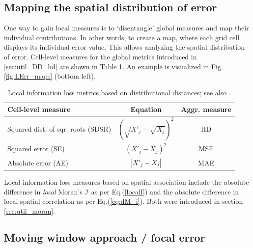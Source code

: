 \subsection{Mapping the spatial distribution of error} \label{sec:util_LOC_cellerror}

One way to gain local measures is to `disentangle' global measures and map their individual contributions. In other words, to create a map, where each grid cell displays its individual error value. This allows analyzing the spatial distribution of error. Cell-level measures for the global metrics introduced in \ref{sec:util_DD_hd} are shown in Table \ref{tab:util_cellLVL}.
An example is visualized in Fig. \ref{fig:LErr_maps} (bottom left).

\begin{table}[H]
    \centering
    \begin{tabular}{l c c}
    \hline
    Cell-level measure & Equation & Aggr. measure \\
    \hline
        \rule{0pt}{18pt} Squared dist. of sqr. roots (SDSR) &  $\left(\sqrt{X'_j} - \sqrt{X_j}\right)^2$ & HD \\
        \rule{0pt}{18pt} Squared error (SE) & $\left(X'_j - X_j\right)^2$ & MSE  \\
        \rule{0pt}{18pt} Absolute error (AE) & $\left|X'_j - X_j\right|$ & MAE  \\
        \hline
    \end{tabular}
    \caption{Local information loss metrics based on distributional distances; see also \citet{AntalEtAl2017}.}
    \label{tab:util_cellLVL}
\end{table}

Local information loss measures based on spatial association include the absolute difference in \emph{local} Moran's $\mathcal{I}$ as per Eq.(\ref{localI}) and the absolute difference in local spatial correlation as per Eq.(\ref{eq:dM_i}). Both were introduced in section \ref{sec:util_moran}.

\subsection{Moving window approach / focal error} \label{sec:util_LOC_mw}

